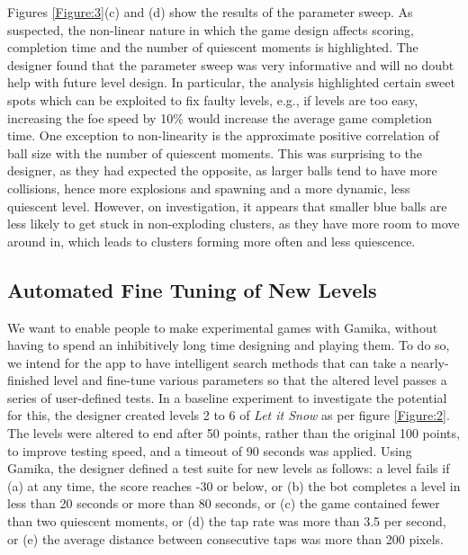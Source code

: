 \documentclass{IEEEtran}
\begin{document}
Figures \ref{Figure:3}(c) and (d) show the results of the parameter sweep. As suspected, the non-linear nature in which the game design affects scoring, completion time and the number of quiescent moments is highlighted.
The designer found that the parameter sweep was very informative and will no doubt help with future level design. In particular, the analysis highlighted certain sweet spots which can be exploited to fix faulty levels, e.g., if levels are too easy, increasing the foe speed by 10\% would increase the average game completion time. One exception to non-linearity is the approximate positive correlation of ball size with the number of quiescent moments. This was surprising to the designer, as they had expected the opposite, as larger balls tend to have more collisions, hence more explosions and spawning and a more dynamic, less quiescent level. However, on investigation, it appears that smaller blue balls are less likely to get stuck in non-exploding clusters, as they have more room to move around in, which leads to clusters forming more often and less quiescence.

\subsection{Automated Fine Tuning of New Levels}
We want to enable people to make experimental games with Gamika, without having to spend an inhibitively long time designing and playing them. To do so, we intend for the app to have intelligent search methods that can take a nearly-finished level and fine-tune various parameters so that the altered level passes a series of user-defined tests. In a baseline experiment to investigate the potential for this, the designer created levels 2 to 6 of \emph{Let it Snow} as per figure \ref{Figure:2}. The levels were altered to end after 50 points, rather than the original 100 points, to improve testing speed, and a timeout of 90 seconds was applied. Using Gamika, the designer defined a test suite for new levels as follows: a level fails if (a) at any time, the score reaches -30 or below, or (b) the bot completes a level in less than 20 seconds or more than 80 seconds, or (c) the game contained fewer than two quiescent moments, or (d) the tap rate was more than 3.5 per second, or (e) the average distance between consecutive taps was more than 200 pixels.
\end{document}
